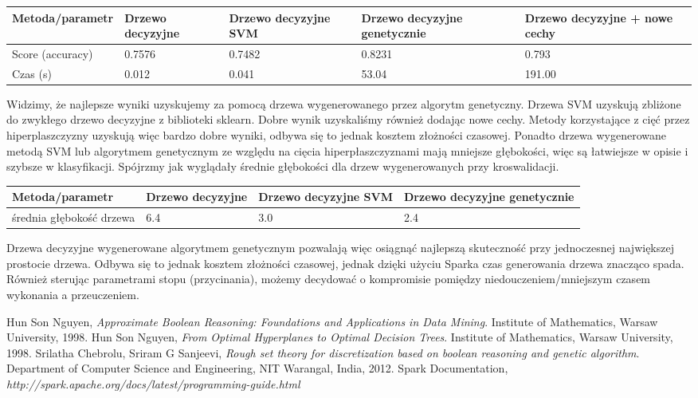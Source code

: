 \documentclass[magisterska]{pracamgr}
\theoremstyle{plain}
\theoremstyle{definition}
\theoremstyle{remark}
\begin{document}
\begin{center}
 \begin{tabular}{l || P{2.5cm} | P{2.5cm} | P{2.5cm} | P{2.5cm}}
  Metoda/parametr     & Drzewo decyzyjne & Drzewo decyzyjne SVM & Drzewo decyzyjne genetycznie & Drzewo decyzyjne + nowe cechy \\ 
  \hline
  Score (accuracy) & 0.7576     & 0.7482     & 0.8231          & 0.793 \\
  Czas (s) & 0.012     & 0.041      & 53.04    & 191.00 \\
 \end{tabular}
\end{center}

Widzimy, że najlepsze wyniki uzyskujemy za pomocą drzewa wygenerowanego przez algorytm genetyczny. Drzewa SVM uzyskują zbliżone do zwykłego
drzewo decyzyjne z biblioteki sklearn. Dobre wynik uzyskaliśmy również dodając nowe cechy. Metody korzystające z cięć przez hiperplaszczyzny
uzyskują więc bardzo dobre wyniki, odbywa się to jednak kosztem złożności czasowej. Ponadto drzewa wygenerowane metodą SVM lub algorytmem genetycznym ze względu na cięcia hiperpłaszczyznami
mają mniejsze głębokości, więc są łatwiejsze w opisie i szybsze w klasyfikacji. Spójrzmy jak wyglądały średnie głębokości dla drzew wygenerowanych przy kroswalidacji.

\begin{center}
 \begin{tabular}{l || P{2.5cm} | P{2.5cm} | P{2.5cm}}
  Metoda/parametr     & Drzewo decyzyjne & Drzewo decyzyjne SVM & Drzewo decyzyjne genetycznie \\ 
  \hline
  średnia głębokość drzewa & 6.4     & 3.0     & 2.4  \\
 \end{tabular}
\end{center}

Drzewa decyzyjne wygenerowane algorytmem genetycznym pozwalają więc osiągnąć najlepszą skuteczność przy jednoczesnej największej prostocie
drzewa. Odbywa się to jednak kosztem złożności czasowej, jednak dzięki użyciu Sparka czas generowania drzewa znacząco spada. 
Również sterując parametrami stopu (przycinania), możemy decydować o kompromisie pomiędzy niedouczeniem/mniejszym czasem wykonania a przeuczeniem. 
\begin{thebibliography}{9}

  Hun Son Nguyen,
  \emph{Approximate Boolean Reasoning: Foundations and Applications in Data Mining}.
  Institute of Mathematics, Warsaw University,
  1998.
  Hun Son Nguyen,
  \emph{From Optimal Hyperplanes to Optimal Decision Trees}.
  Institute of Mathematics, Warsaw University,
  1998.
  Srilatha Chebrolu, Sriram G Sanjeevi,
  \emph{Rough set theory for discretization based on boolean reasoning and 
  genetic algorithm}.
  Department of Computer Science and Engineering, NIT Warangal, India,
  2012.
 Spark Documentation,
 \emph{http://spark.apache.org/docs/latest/programming-guide.html}

\end{thebibliography}
 
\end{document}
